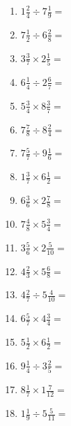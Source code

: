 \documentclass[12pt]{article}
\begin{document}
\begin{enumerate}
\item \large $ 1 \frac{2}{4} \div 7 \frac{1}{9} = $ \vspace{1.6cm}
\item \large $ 7 \frac{1}{2} \div 6 \frac{2}{8} = $ \vspace{1.6cm}
\item \large $ 3 \frac{3}{7} \times 2 \frac{1}{5} = $ \vspace{1.6cm}
\item \large $ 6 \frac{1}{4} \div 2 \frac{6}{7} = $ \vspace{1.6cm}
\newpage
\item \large $ 5 \frac{3}{4} \times 8 \frac{3}{7} = $ \vspace{1.6cm}
\item \large $ 7 \frac{7}{8} \div 8 \frac{2}{4} = $ \vspace{1.6cm}
\item \large $ 7 \frac{5}{7} \div 9 \frac{1}{6} = $ \vspace{1.6cm}
\item \large $ 1 \frac{3}{7} \times 6 \frac{1}{2} = $ \vspace{1.6cm}
\item \large $ 6 \frac{3}{6} \times 2 \frac{7}{8} = $ \vspace{1.6cm}
\item \large $ 7 \frac{4}{8} \times 5 \frac{3}{4} = $ \vspace{1.6cm}
\item \large $ 3 \frac{5}{6} \times 2 \frac{5}{10} = $ \vspace{1.6cm}
\item \large $ 4 \frac{2}{3} \times 5 \frac{6}{8} = $ \vspace{1.6cm}
\item \large $ 4 \frac{2}{7} \div 5 \frac{4}{10} = $ \vspace{1.6cm}
\item \large $ 6 \frac{5}{7} \times 4 \frac{3}{4} = $ \vspace{1.6cm}
\newpage
\item \large $ 5 \frac{1}{2} \times 6 \frac{1}{2} = $ \vspace{1.6cm}
\item \large $ 9 \frac{1}{4} \div 3 \frac{2}{5} = $ \vspace{1.6cm}
\item \large $ 8 \frac{1}{7} \times 1 \frac{7}{12} = $ \vspace{1.6cm}
\item \large $ 1 \frac{1}{9} \div 5 \frac{5}{11} = $ \vspace{1.6cm}

\end{enumerate}
\end{document}
